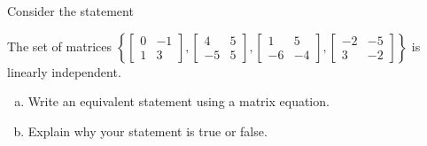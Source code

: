 
\begin{exerciseStatement}


Consider the statement 
\begin{center}\begin{minipage}{0.8\textwidth}
 The set of matrices \( \left\{ \left[\begin{array}{cc}
0 & -1 \\
1 & 3
\end{array}\right] , \left[\begin{array}{cc}
4 & 5 \\
-5 & 5
\end{array}\right] , \left[\begin{array}{cc}
1 & 5 \\
-6 & -4
\end{array}\right] , \left[\begin{array}{cc}
-2 & -5 \\
3 & -2
\end{array}\right] \right\} \) is linearly independent.
\end{minipage}\end{center}
    


\begin{enumerate}[(a)]
\item  Write an equivalent statement using a matrix equation.
\item  Explain why your statement is true or false.
\end{enumerate}
    
\end{exerciseStatement}
    
